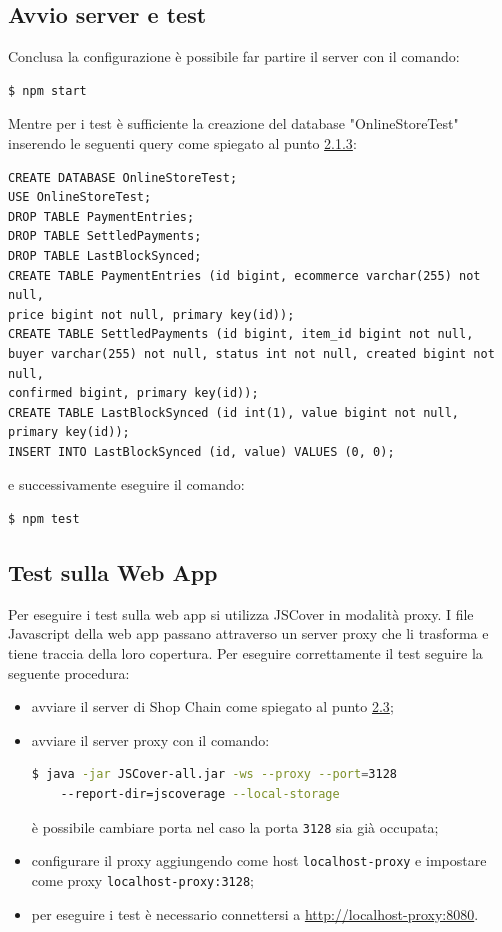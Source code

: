\documentclass[a4paper, 12pt]{article}
\begin{document}
\subsection{Avvio server e test}
\label{sec:avvio}
Conclusa la configurazione è possibile far partire il server con il comando:
\begin{lstlisting}[language=bash]
  $ npm start
\end{lstlisting}
Mentre per i test è sufficiente la creazione del database "OnlineStoreTest" inserendo le seguenti query come spiegato al punto \hyperref[sec:db]{2.1.3}:
\begin{verbatim}
CREATE DATABASE OnlineStoreTest;
USE OnlineStoreTest;
DROP TABLE PaymentEntries;
DROP TABLE SettledPayments;
DROP TABLE LastBlockSynced;
CREATE TABLE PaymentEntries (id bigint, ecommerce varchar(255) not null,
price bigint not null, primary key(id));
CREATE TABLE SettledPayments (id bigint, item_id bigint not null,
buyer varchar(255) not null, status int not null, created bigint not null,
confirmed bigint, primary key(id));
CREATE TABLE LastBlockSynced (id int(1), value bigint not null, primary key(id));
INSERT INTO LastBlockSynced (id, value) VALUES (0, 0);
\end{verbatim}
e successivamente eseguire il comando:
\begin{lstlisting}[language=bash]
  $ npm test
\end{lstlisting}
\subsection{Test sulla Web App}
Per eseguire i test sulla web app si utilizza JSCover in modalità proxy. I file Javascript della web app passano attraverso un server proxy che li trasforma e tiene traccia della loro copertura. Per eseguire correttamente il test seguire la seguente procedura:
\begin{itemize}
  \item avviare il server di Shop Chain come spiegato al punto \hyperref[sec:avvio]{2.3};
  \item avviare il server proxy con il comando:
  \begin{lstlisting}[language=bash]
    $ java -jar JSCover-all.jar -ws --proxy --port=3128
    --report-dir=jscoverage --local-storage
  \end{lstlisting}
  è possibile cambiare porta nel caso la porta \verb|3128| sia già occupata;
  \item configurare il proxy aggiungendo come host \verb|localhost-proxy| e impostare come proxy \verb|localhost-proxy:3128|;
  \item per eseguire i test è necessario connettersi a \url{http://localhost-proxy:8080}.
\end{itemize}
\end{document}
